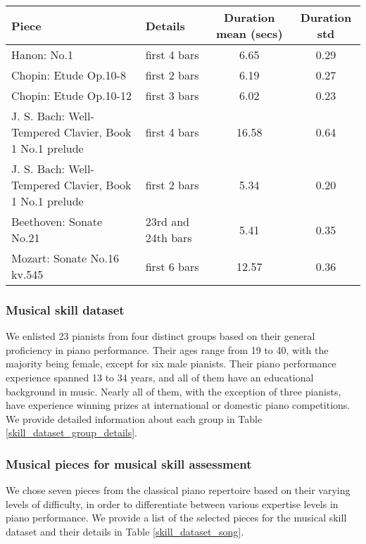 \begin{table*}[h!]
  \caption{List of musical pieces for musical skill assessment.}
  \begin{tabular}{l|lcc}
    \toprule
    Piece & Details & Duration mean (secs) & Duration std \\
    \midrule
    Hanon: No.1     & first 4 bars & 6.65 & 0.29\\ \hline
    Chopin: Etude Op.10-8     & first 2 bars & 6.19 & 0.27\\ \hline
    Chopin: Etude Op.10-12     & first 3 bars & 6.02 & 0.23\\ \hline
    J. S. Bach: Well-Tempered Clavier, Book 1 No.1 prelude     & first 4 bars & 16.58 & 0.64\\ \hline
    J. S. Bach: Well-Tempered Clavier, Book 1 No.1 prelude     & first 2 bars & 5.34 & 0.20 \\ \hline
    Beethoven: Sonate No.21     & 23rd and 24th bars & 5.41 & 0.35 \\ \hline
    Mozart: Sonate No.16 kv.545     & first 6 bars & 12.57 & 0.36\\ \hline
  \end{tabular}
  \label{skill_dataset_song}
\end{table*}

\subsubsection*{Musical skill dataset}
We enlisted 23 pianists from four distinct groups based on their general proficiency in piano performance. 
Their ages range from 19 to 40, with the majority being female, except for six male pianists. 
Their piano performance experience spanned 13 to 34 years, and all of them have an educational background in music. 
Nearly all of them, with the exception of three pianists, have experience winning prizes at international or domestic piano competitions. 
We provide detailed information about each group in Table \ref{skill_dataset_group_details}.

\subsubsection*{Musical pieces for musical skill assessment}
We chose seven pieces from the classical piano repertoire based on their varying levels of difficulty, in order to differentiate between various expertise levels in piano performance.
We provide a list of the selected pieces for the musical skill dataset and their details in Table \ref{skill_dataset_song}.

